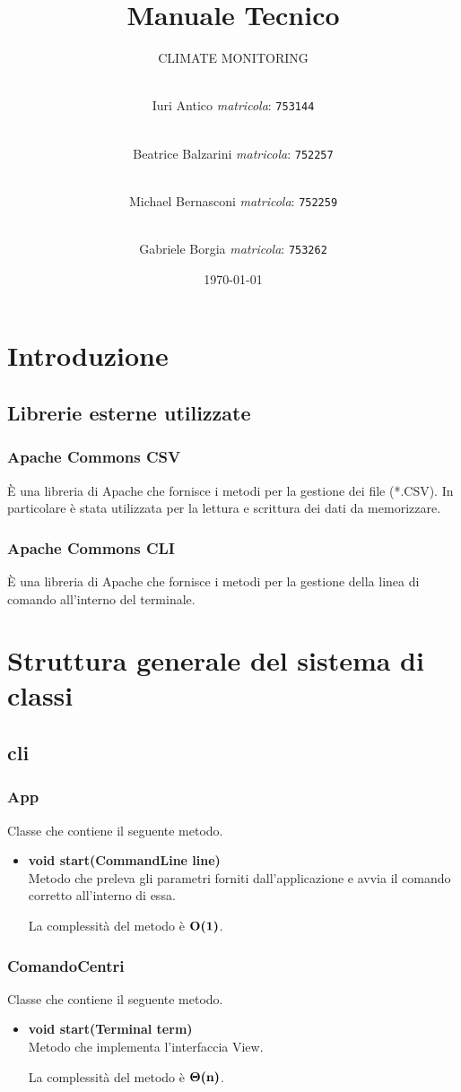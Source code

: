 \documentclass[a4paper, 12pt]{scrreprt}
\title {Manuale Tecnico}
\subtitle{CLIMATE MONITORING}
\author{
	\\Iuri Antico \textit{matricola}:
	\texttt{753144}
	\and \\
	Beatrice Balzarini \textit{matricola}:
	\texttt{752257}
	\and \\
	Michael Bernasconi \textit{matricola}:
	\texttt{752259}
	\and \\
	Gabriele Borgia \textit{matricola}:
	\texttt{753262}
}
\date{\today}
\begin{document}
	\maketitle
	\tableofcontents

	\chapter{Introduzione}
		\section{Librerie esterne utilizzate}
			\subsection{Apache Commons CSV}
			\`E una libreria di Apache che fornisce i metodi per la gestione dei file (*.CSV). In particolare \`e stata utilizzata per la lettura e scrittura dei dati da memorizzare.
			\subsection{Apache Commons CLI}
			\`E una libreria di Apache che fornisce i metodi per la gestione della linea di comando all'interno del terminale.

	\chapter{Struttura generale del sistema di classi}
		\section{cli}
			\subsection{App}
			Classe che contiene il seguente metodo.
			\begin{itemize}
				\item \textbf{void start(CommandLine line)}
				\\Metodo che preleva gli parametri forniti dall'applicazione e avvia il comando corretto all'interno di essa.
				
				La complessit\`a del metodo \`e $\mathbf{O}\textbf{(1)}$.
			\end{itemize}
			
			\subsection{ComandoCentri}
			Classe che contiene il seguente metodo.
			\begin{itemize}
				\item \textbf{void start(Terminal term)}
				\\Metodo che implementa l'interfaccia View.
				
				La complessit\`a del metodo \`e $\mathbf{\Theta}\textbf{(n)}$.
				
			\end{itemize}
			
\end{document}
